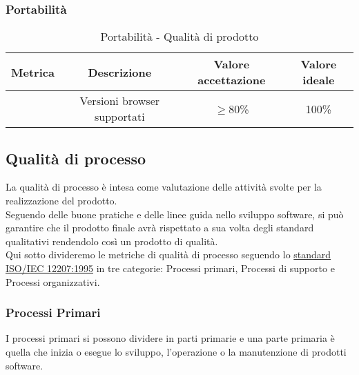 \documentclass[11pt]{article}
\begin{document}
\begin{justify}
\subsubsection{Portabilità}
\begin{table}[H]
  \centering
\begin{tabular}{|c|c|c|c|}
  \hline
  \textbf{Metrica} & \textbf{Descrizione} & \textbf{Valore accettazione} & \textbf{Valore ideale}\\
  \hline
  & Versioni browser supportati & $\geq$80\% & 100\% \\
  \hline
\end{tabular}
\caption{Portabilità - Qualità di prodotto}
\label{tab:portabilità}
\end{table}


\subsection{Qualità di processo}
La qualità di processo è intesa come valutazione delle attività svolte per la realizzazione del prodotto.\\
Seguendo delle buone pratiche e delle linee guida nello sviluppo software, si può garantire che il prodotto finale avrà rispettato a sua volta degli standard qualitativi rendendolo così un prodotto di qualità.\\
Qui sotto divideremo le metriche di qualità di processo seguendo lo \hyperref[ISO 12207:1995]{standard ISO/IEC 12207:1995} in tre categorie: Processi primari, Processi di supporto e Processi organizzativi.\\
\subsubsection{Processi Primari}
I processi primari si possono dividere in parti primarie e una parte primaria è quella che inizia o esegue lo sviluppo, l'operazione o la manutenzione di prodotti software.\\

\newpage


\end{justify}
\end{document}
